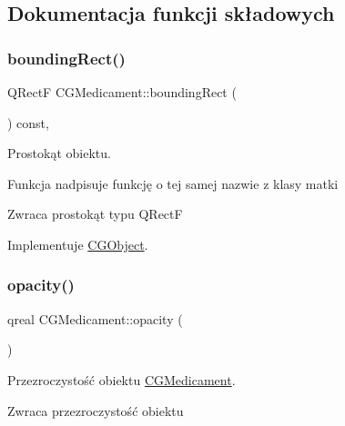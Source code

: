 \subsection{Dokumentacja funkcji składowych}
\mbox{\label{class_c_g_medicament_aa64c33d0aced10421c734961cfdd8344}} 
\subsubsection{\texorpdfstring{bounding\+Rect()}{boundingRect()}}
{\footnotesize\ttfamily Q\+RectF C\+G\+Medicament\+::bounding\+Rect (\begin{DoxyParamCaption}{ }\end{DoxyParamCaption}) const\hspace{0.3cm}{\ttfamily [override]}, {\ttfamily [virtual]}}



Prostokąt obiektu. 

Funkcja nadpisuje funkcję o tej samej nazwie z klasy matki \begin{DoxyReturn}{Zwraca}
prostokąt typu Q\+RectF 
\end{DoxyReturn}


Implementuje \mbox{\hyperlink{class_c_g_object_ab9edf3d10a53c254cdb5d3d8de930207}{C\+G\+Object}}.

\mbox{\label{class_c_g_medicament_a17c3b841c5fde02907d194889d87abe2}} 
\subsubsection{\texorpdfstring{opacity()}{opacity()}}
{\footnotesize\ttfamily qreal C\+G\+Medicament\+::opacity (\begin{DoxyParamCaption}{ }\end{DoxyParamCaption})}



Przezroczystość obiektu \mbox{\hyperlink{class_c_g_medicament}{C\+G\+Medicament}}. 

\begin{DoxyReturn}{Zwraca}
przezroczystość obiektu 
\end{DoxyReturn}
\mbox{\label{class_c_g_medicament_a833735e523952b5e5867ff36d18e95b5}} 

